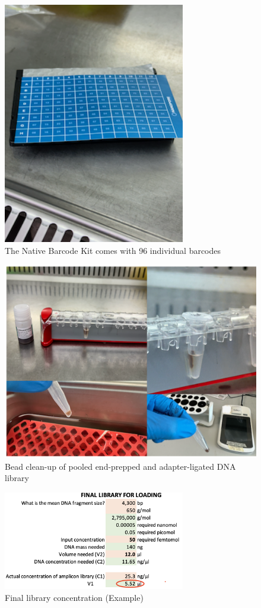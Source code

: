 \documentclass[
]{book}
\begin{document}
\begin{figure}
\centering
\includegraphics[width=3.125in,height=\textheight]{./img/barcode_ligation.png}
\caption{The Native Barcode Kit comes with 96 individual barcodes}
\end{figure}

\begin{figure}
\centering
\includegraphics[width=5.20833in,height=\textheight]{./img/libraryprepcleanup_comb.png}
\caption{Bead clean-up of pooled end-prepped and adapter-ligated DNA library}
\end{figure}

\begin{figure}
\centering
\includegraphics[width=3.125in,height=\textheight]{./img/libraryprepsminDNA.png}
\caption{Final library concentration (Example)}
\end{figure}
\end{document}

